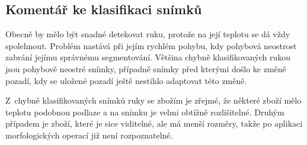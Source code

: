 	\subsection{Komentář ke klasifikaci snímků}
    Obecně by mělo být snadné detekovat ruku, protože na její teplotu se dá vždy spolehnout. Problém nastává při jejím rychlém pohybu, kdy pohybová neostrost zabrání jejímu správnému segmentování. Většina chybně klasifikovaných rukou jsou pohybově neostré snímky, případně snímky před kterými došlo ke změně pozadí, kdy se uložené pozadí ještě nestihlo adaptovat této změně.
    
    Z~chybně klasifikovaných snímků ruky se zbožím je zřejmé, že některé zboží mělo teplotu podobnou podlaze a na snímku je velmi obtížně rozlišitelné. Druhým případem je zboží, které je sice viditelné, ale má menší rozměry, takže po aplikaci morfologických operací již není rozpoznatelné.

